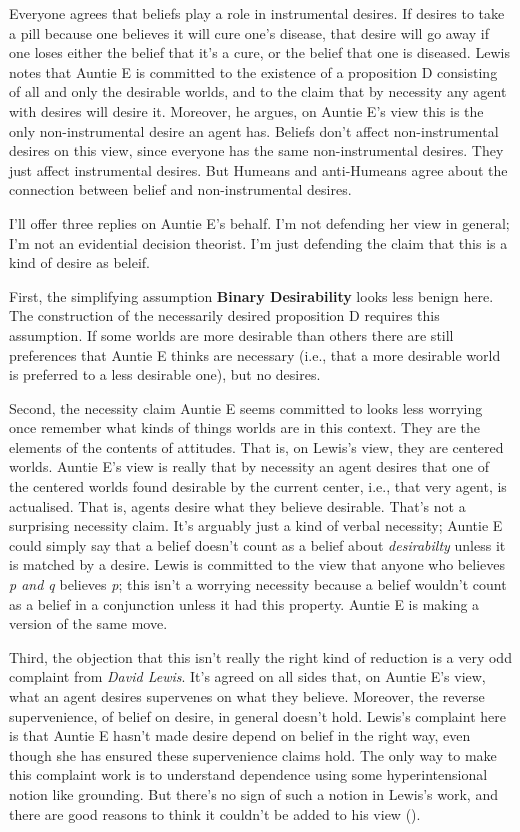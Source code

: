 \documentclass[
  11pt,
  letterpaper,
  DIV=11,
  numbers=noendperiod,
  twoside]{scrartcl}
\begin{document}
Everyone agrees that beliefs play a role in instrumental desires. If
desires to take a pill because one believes it will cure one's disease,
that desire will go away if one loses either the belief that it's a
cure, or the belief that one is diseased. Lewis notes that Auntie E is
committed to the existence of a proposition D consisting of all and only
the desirable worlds, and to the claim that by necessity any agent with
desires will desire it. Moreover, he argues, on Auntie E's view this is
the only non-instrumental desire an agent has. Beliefs don't affect
non-instrumental desires on this view, since everyone has the same
non-instrumental desires. They just affect instrumental desires. But
Humeans and anti-Humeans agree about the connection between belief and
non-instrumental desires.

I'll offer three replies on Auntie E's behalf. I'm not defending her
view in general; I'm not an evidential decision theorist. I'm just
defending the claim that this is a kind of desire as beleif.

First, the simplifying assumption \textbf{Binary Desirability} looks
less benign here. The construction of the necessarily desired
proposition D requires this assumption. If some worlds are more
desirable than others there are still preferences that Auntie E thinks
are necessary (i.e., that a more desirable world is preferred to a less
desirable one), but no desires.

Second, the necessity claim Auntie E seems committed to looks less
worrying once remember what kinds of things worlds are in this context.
They are the elements of the contents of attitudes. That is, on Lewis's
view, they are centered worlds. Auntie E's view is really that by
necessity an agent desires that one of the centered worlds found
desirable by the current center, i.e., that very agent, is actualised.
That is, agents desire what they believe desirable. That's not a
surprising necessity claim. It's arguably just a kind of verbal
necessity; Auntie E could simply say that a belief doesn't count as a
belief about \emph{desirabilty} unless it is matched by a desire. Lewis
is committed to the view that anyone who believes \emph{p and q}
believes \emph{p}; this isn't a worrying necessity because a belief
wouldn't count as a belief in a conjunction unless it had this property.
Auntie E is making a version of the same move.

Third, the objection that this isn't really the right kind of reduction
is a very odd complaint from \emph{David Lewis}. It's agreed on all
sides that, on Auntie E's view, what an agent desires supervenes on what
they believe. Moreover, the reverse supervenience, of belief on desire,
in general doesn't hold. Lewis's complaint here is that Auntie E hasn't
made desire depend on belief in the right way, even though she has
ensured these supervenience claims hold. The only way to make this
complaint work is to understand dependence using some hyperintensional
notion like grounding. But there's no sign of such a notion in Lewis's
work, and there are good reasons to think it couldn't be added to his
view ().
\end{document}
